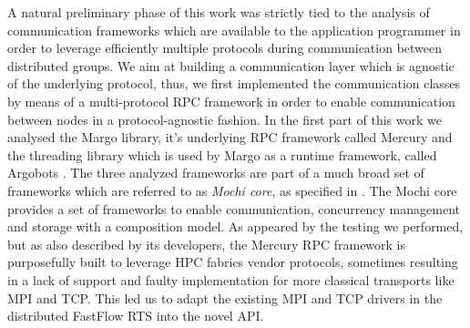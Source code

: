 \documentclass[12pt, oneside]{report}
\begin{document}
A natural preliminary phase of this work was strictly tied to the analysis of communication frameworks which are available to the application programmer in order to leverage efficiently multiple protocols during communication between distributed groups. We aim at building a communication layer which is agnostic of the underlying protocol, thus, we first implemented the communication classes by means of a multi-protocol RPC framework in order to enable communication between nodes in a protocol-agnostic fashion. In the first part of this work we analysed the Margo \cite{mochi-core} library, it's underlying RPC framework called Mercury \cite{mochi-core, mercury} and the threading library which is used by Margo as a runtime framework, called Argobots \cite{argobots-paper}. The three analyzed frameworks are part of a much broad set of frameworks which are referred to as \textit{Mochi core}, as specified in \cite{mochi-core}.  The Mochi core provides a set of frameworks to enable communication, concurrency management and storage with a composition model. As appeared by the testing we performed, but as also described by its developers, the Mercury RPC framework is purposefully built to leverage HPC fabrics vendor protocols, sometimes resulting in a lack of support and faulty implementation for more classical transports like MPI and TCP. This led us to adapt the existing MPI and TCP drivers in the distributed FastFlow RTS into the novel API. 
\end{document}
